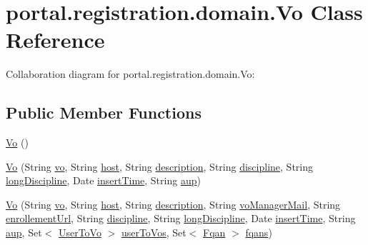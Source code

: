\hypertarget{classportal_1_1registration_1_1domain_1_1Vo}{
\section{portal.registration.domain.Vo Class Reference}
\label{classportal_1_1registration_1_1domain_1_1Vo}
}


Collaboration diagram for portal.registration.domain.Vo:
\subsection*{Public Member Functions}
\begin{DoxyCompactItemize}
\item 
\hyperlink{classportal_1_1registration_1_1domain_1_1Vo_aa7358ece9ffb9dd923dab2e94fc0492b}{Vo} ()
\item 
\hyperlink{classportal_1_1registration_1_1domain_1_1Vo_a6c7d6286e3e7267c247efb1e5e7d07da}{Vo} (String \hyperlink{classportal_1_1registration_1_1domain_1_1Vo_a1c5498821ecbdd3d80d5dce3f26a907e}{vo}, String \hyperlink{classportal_1_1registration_1_1domain_1_1Vo_a39734694dfee646e14aa1a49cb06e5a0}{host}, String \hyperlink{classportal_1_1registration_1_1domain_1_1Vo_ae59559dc7f4ebe9ba0fe8657774d6ddf}{description}, String \hyperlink{classportal_1_1registration_1_1domain_1_1Vo_ab5ce7543fdba244953f198d31d367723}{discipline}, String \hyperlink{classportal_1_1registration_1_1domain_1_1Vo_ace2d40b5322f647c70ba092e468edaec}{longDiscipline}, Date \hyperlink{classportal_1_1registration_1_1domain_1_1Vo_a151311e5b51385dffb6d6d207159ac65}{insertTime}, String \hyperlink{classportal_1_1registration_1_1domain_1_1Vo_af69ab6e7d6a8c9d628bea1a85e3c27d3}{aup})
\item 
\hyperlink{classportal_1_1registration_1_1domain_1_1Vo_ae2aa4401d3794462199ad0b407b2c3dd}{Vo} (String \hyperlink{classportal_1_1registration_1_1domain_1_1Vo_a1c5498821ecbdd3d80d5dce3f26a907e}{vo}, String \hyperlink{classportal_1_1registration_1_1domain_1_1Vo_a39734694dfee646e14aa1a49cb06e5a0}{host}, String \hyperlink{classportal_1_1registration_1_1domain_1_1Vo_ae59559dc7f4ebe9ba0fe8657774d6ddf}{description}, String \hyperlink{classportal_1_1registration_1_1domain_1_1Vo_a40f905eb8ab449d765fd1bcb7488a876}{voManagerMail}, String \hyperlink{classportal_1_1registration_1_1domain_1_1Vo_ad9cd8c77be188df99d145d515c7249c7}{enrollementUrl}, String \hyperlink{classportal_1_1registration_1_1domain_1_1Vo_ab5ce7543fdba244953f198d31d367723}{discipline}, String \hyperlink{classportal_1_1registration_1_1domain_1_1Vo_ace2d40b5322f647c70ba092e468edaec}{longDiscipline}, Date \hyperlink{classportal_1_1registration_1_1domain_1_1Vo_a151311e5b51385dffb6d6d207159ac65}{insertTime}, String \hyperlink{classportal_1_1registration_1_1domain_1_1Vo_af69ab6e7d6a8c9d628bea1a85e3c27d3}{aup}, Set$<$ \hyperlink{classportal_1_1registration_1_1domain_1_1UserToVo}{UserToVo} $>$ \hyperlink{classportal_1_1registration_1_1domain_1_1Vo_a643d30daf36de4c59c48ce381f5ca18d}{userToVos}, Set$<$ \hyperlink{classportal_1_1registration_1_1domain_1_1Fqan}{Fqan} $>$ \hyperlink{classportal_1_1registration_1_1domain_1_1Vo_ac9fbb476da6a7943923272ceaee88bf8}{fqans})

\end{DoxyCompactItemize}
